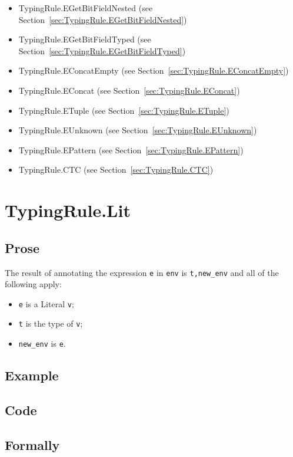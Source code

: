 \documentclass{book}
\begin{document}
\begin{itemize}
\item TypingRule.EGetBitFieldNested (see Section~\ref{sec:TypingRule.EGetBitFieldNested})
\item TypingRule.EGetBitFieldTyped (see Section~\ref{sec:TypingRule.EGetBitFieldTyped})
\item TypingRule.EConcatEmpty (see Section~\ref{sec:TypingRule.EConcatEmpty})
\item TypingRule.EConcat (see Section~\ref{sec:TypingRule.EConcat})
\item TypingRule.ETuple (see Section~\ref{sec:TypingRule.ETuple})
\item TypingRule.EUnknown (see Section~\ref{sec:TypingRule.EUnknown})
\item TypingRule.EPattern (see Section~\ref{sec:TypingRule.EPattern})
\item TypingRule.CTC (see Section~\ref{sec:TypingRule.CTC})
\end{itemize}

\section{TypingRule.Lit \label{sec:TypingRule.Lit}}

  \subsection{Prose}
  The result of annotating the expression \texttt{e} in \texttt{env} is
\texttt{t,new\_env} and all of the following apply:
  \begin{itemize}
  \item \texttt{e} is a Literal \texttt{v};
  \item \texttt{t} is the type of \texttt{v};
  \item \texttt{new\_env} is \texttt{e}.
  \end{itemize}

  \subsection{Example}

  \subsection{Code}
 
\begin{emptyformal}
  \subsection{Formally}
\end{emptyformal}
\end{document}
